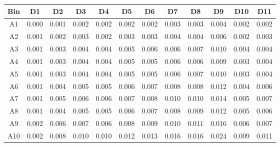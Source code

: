 \begin{tabular}{c@{~~~}c@{~~}c@{~~}c@{~~}c@{~~}c@{~~}c@{~~}c@{~~}c@{~~}c@{~~}c@{~~}c}
\hline
 \hline
Bin	& D1 & D2 & D3 & D4 & D5 & D6 & D7 & D8 & D9 & D10 & D11 \\
\hline
A1	&  0.000 &  0.001 &  0.002 &  0.002 &  0.002 &  0.002 &  0.003 &  0.003 &  0.004 &  0.002 &  0.002 \\
A2	&  0.001 &  0.002 &  0.003 &  0.002 &  0.003 &  0.003 &  0.004 &  0.004 &  0.006 &  0.002 &  0.003 \\
A3	&  0.001 &  0.003 &  0.004 &  0.004 &  0.005 &  0.006 &  0.006 &  0.007 &  0.010 &  0.004 &  0.004 \\
A4	&  0.001 &  0.003 &  0.004 &  0.004 &  0.005 &  0.005 &  0.006 &  0.006 &  0.009 &  0.003 &  0.004 \\
A5	&  0.001 &  0.003 &  0.004 &  0.004 &  0.005 &  0.005 &  0.006 &  0.007 &  0.010 &  0.003 &  0.004 \\
A6	&  0.001 &  0.004 &  0.005 &  0.005 &  0.006 &  0.007 &  0.008 &  0.008 &  0.012 &  0.004 &  0.006 \\
A7	&  0.001 &  0.005 &  0.006 &  0.006 &  0.007 &  0.008 &  0.010 &  0.010 &  0.014 &  0.005 &  0.007 \\
A8	&  0.001 &  0.004 &  0.005 &  0.005 &  0.006 &  0.007 &  0.008 &  0.009 &  0.012 &  0.005 &  0.006 \\
A9	&  0.002 &  0.006 &  0.007 &  0.006 &  0.008 &  0.009 &  0.010 &  0.011 &  0.016 &  0.006 &  0.007 \\
A10	&  0.002 &  0.008 &  0.010 &  0.010 &  0.012 &  0.013 &  0.016 &  0.016 &  0.024 &  0.009 &  0.011 \\
\hline
 \hline
\end{tabular}
